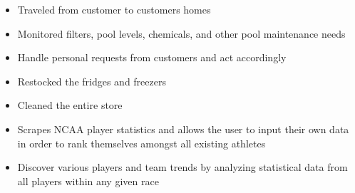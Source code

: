 \documentclass[10pt,a4paper,ragged2e,withhyper]{altacv}
\begin{document}
\begin{paracol}{2}

\begin{itemize}
\item Traveled from customer to customers homes
\item Monitored filters, pool levels, chemicals, and other pool maintenance needs
\item Handle personal requests from customers and act accordingly
\end{itemize}

\divider

\begin{itemize}
\item Restocked the fridges and freezers
\item Cleaned the entire store
\end{itemize}


\begin{itemize}
\item Scrapes NCAA player statistics and allows the user to input their own data in order to rank themselves amongst all existing athletes
\item Discover various players and team trends by analyzing statistical data from all players within any given race
\end{itemize}

\divider


\medskip



\divider


\divider



 

\end{paracol}
\end{document}
